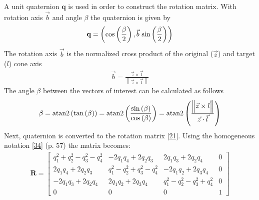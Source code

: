 \documentclass[letterpaper,10pt,english]{sphinxmanual}
\begin{document}
			\sphinxAtStartPar
			A unit quaternion \(\textbf{q}\) is used in order to construct the rotation matrix. With rotation axis \(\vec{b}\) and angle \(\beta\) the quaternion is given by
			\begin{equation*}
			\begin{split}\textbf{q} = \left ( \textup{cos}\left (\frac{\beta}{2}\right ), \vec{b}\textup{ sin}\left ( \frac{\beta}{2} \right )\right )\end{split}
			\end{equation*}
			\sphinxAtStartPar
			The rotation axis \(\vec{b}\) is the normalized cross product of the original (\(\vec{z}\)) and target (\(l\)) cone axis
			\begin{equation*}
			\begin{split}\vec{b}=\frac{\vec{z}\times\vec{l}}{\left \| \vec{z}\times\vec{l} \right \|}\end{split}
			\end{equation*}
			\sphinxAtStartPar
			The angle \(\beta\) between the vectors of interest can be calculated as follows
			\begin{equation*}
			\begin{split}\beta
			=\textup{atan2}\left ( \textup{tan}\left ( \beta \right ) \right )
			=\textup{atan2}\left ( \frac{\textup{sin}\left ( \beta \right )}{\textup{cos}\left ( \beta \right )} \right )
			=\textup{atan2}\left ( \frac{\left \| \vec{z}\times\vec{l} \right \|}{\vec{z}\cdot \vec{l}} \right )\end{split}
			\end{equation*}
			\sphinxAtStartPar
			Next, quaternion is converted to the rotation matrix {[}\hyperlink{cite.NBodySimulation/Appendix:id7}{21}{]}. Using the homogeneous notation {[}\hyperlink{cite.NBodySimulation/Appendix:id8}{34}{]} (p. 57) the matrix becomes:
			\begin{equation*}
			\begin{split}\mathbf{R}=\begin{bmatrix}
			q_{1}^{2}+q_{2}^{2}-q_{3}^{2}-q_{4}^{2} & -2q_{1}q_{4}+2q_{2}q_{3} & 2q_{1}q_{3}+2q_{2}q_{4} & 0\\
			2q_{1}q_{4}+2q_{2}q_{3} & q_{1}^{2}-q_{2}^{2}+q_{3}^{2}-q_{4}^{2} & -2q_{1}q_{2}+2q_{3}q_{4} & 0\\
			-2q_{1}q_{3}+2q_{2}q_{4} & 2q_{1}q_{2}+2q_{3}q_{4} & q_{1}^{2}-q_{2}^{2}-q_{3}^{2}+q_{4}^{2} & 0\\
			0  & 0 & 0 & 1
			\end{bmatrix}\end{split}
			\end{equation*}
\end{document}
